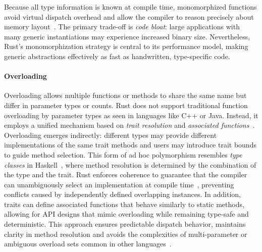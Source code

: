 Because all type information is known at compile time, monomorphized functions avoid virtual dispatch overhead and allow the compiler to reason precisely about memory layout~\cite{Lattner04}.
The primary trade-off is \textit{code bloat}: large applications with many generic instantiations may experience increased binary size.
Nevertheless, Rust's monomorphization strategy is central to its performance model, making generic abstractions effectively as fast as handwritten, type-specific code.

\paragraph{Overloading}
Overloading allows multiple functions or methods to share the same name but differ in parameter types or counts.
Rust does not support traditional function overloading by parameter types as seen in languages like C++ or Java.
Instead, it employs a unified mechanism based on \textit{trait resolution} and \textit{associated functions}~\cite{RustBook}.
Overloading emerges indirectly: different types may provide different implementations of the same trait methods and users may introduce trait bounds to guide method selection.
This form of ad hoc polymorphism resembles \textit{type classes} in Haskell~\cite{Wadler88,Hall96}, where method resolution is determined by the combination of the type and the trait.
Rust enforces coherence to guarantee that the compiler can unambiguously select an implementation at compile time~\cite{Chlipala11,Garrigue98}, preventing conflicts caused by independently defined overlapping instances.
In addition, traits can define associated functions that behave similarly to static methods, allowing for API designs that mimic overloading while remaining type-safe and deterministic.
This approach ensures predictable dispatch behavior, maintains clarity in method resolution and avoids the complexities of multi-parameter or ambiguous overload sets common in other languages~\cite{PeytonJones00}.

